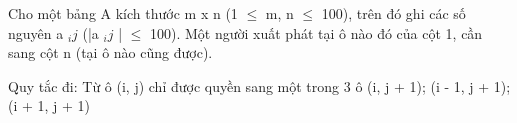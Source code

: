 Cho một bảng A kích thước m x n (1  $\le$  m, n  $\le$  100), trên đó ghi các số nguyên a   $_    ij   $   (|a   $_    ij   $   |  $\le$  100). Một người xuất phát tại ô nào đó của cột 1, cần sang cột n (tại ô nào cũng được).  

   Quy tắc đi: Từ ô (i, j) chỉ được quyền sang một trong 3 ô (i, j + 1); (i - 1, j + 1); (i + 1, j + 1)  

\